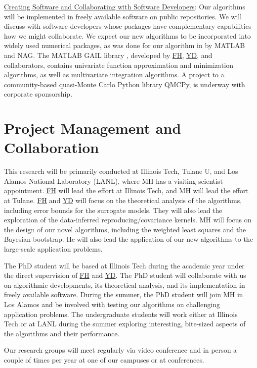 \documentclass[11pt]{NSFamsart}
\newcommand{\Upara}[1]{\noindent\underline{\upshape #1}:}
\newcommand{\FH}{\hyperlink{FHlink}{FH}\xspace}
\newcommand{\YD}{\hyperlink{YDlink}{YD}\xspace}
\newcommand{\GAIL}{GAIL\xspace}
\newcommand{\NAG}{NAG\xspace}
\newcommand{\MATLAB}{MATLAB\xspace}
\begin{document}
\Upara{Creating Software and Collaborating with Software Developers}
Our algorithms will be implemented in freely available software on public repositories. We will discuss with software developers whose packages have complementary capabilities how we might collaborate. We expect our new algorithms to be incorporated into widely used numerical packages, as was done for our algorithm in \cite{HonHic00a} by \MATLAB and \NAG. The \MATLAB \GAIL library \citep{ChoEtal19a}, developed by \FH, \YD, and collaborators, contains univariate function approximation and minimization algorithms, as well as multivariate integration algorithms. A project to a community-based quasi-Monte Carlo Python library QMCPy, is underway with corporate sponsorship. 

\section{Project Management and Collaboration}
This research will be primarily conducted at Illinois Tech, Tulane U, and Los Alamos National Laboratory (LANL), where MH has a visiting scientist appointment. \FH will lead the effort at Illinois Tech, and MH will lead the effort at Tulane. \FH and \YD will focus on the theoretical analysis of the algorithms, including error bounds for the surrogate models. They will also lead the exploration of the data-inferred reproducing/covariance kernels. MH will focus on the design of our novel algorithms, including the weighted least squares and the Bayesian bootstrap. He will also lead the application of our new algorithms to the large-scale application problems. 

The PhD student will be based at Illinois Tech during the academic year under the direct supervision of \FH and \YD. The PhD student will collaborate with us on algorithmic developments, its theoretical analysis, and its implementation in freely available software. During the summer, the PhD student will join MH in Los Alamos and be involved with testing our algorithms on challenging application problems. The undergraduate students will work either at Illinois Tech or at LANL during the summer exploring interesting, bite-sized aspects of the algorithms and their performance.

Our research groups will meet regularly via video conference and in person a couple of times per year at one of our campuses or at conferences.
\end{document}
